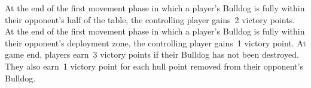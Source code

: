 \begin{scoring}  
\begin{primaries}

  At the end of the first movement phase in which a player's Bulldog
  is fully within their opponent's half of the table, the controlling
  player gains~2 victory points.  At the end of the first movement
  phase in which a player's Bulldog is fully within their opponent's
  deployment zone, the controlling player gains~1 victory point.  At
  game end, players earn~3 victory points if their Bulldog has not
  been destroyed.  They also earn~1 victory point for each hull point
  removed from their opponent's Bulldog.


\end{primaries}
\end{scoring}
